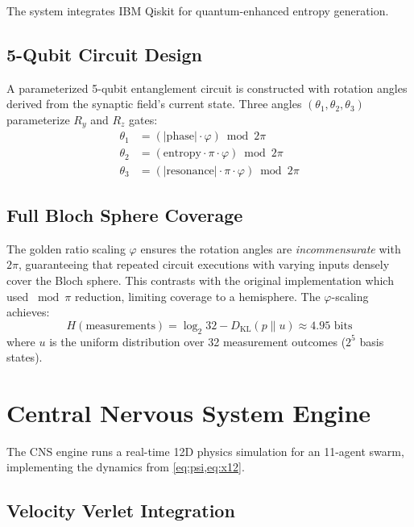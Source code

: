 \documentclass[11pt,a4paper]{article}
\begin{document}
The system integrates IBM Qiskit for quantum-enhanced entropy generation.

\subsection{5-Qubit Circuit Design}

A parameterized 5-qubit entanglement circuit is constructed with rotation angles derived from the synaptic field's current state. Three angles $(\theta_1, \theta_2, \theta_3)$ parameterize $R_y$ and $R_z$ gates:
\begin{align}
    \theta_1 &= (|\text{phase}| \cdot \varphi) \bmod 2\pi \label{eq:theta1} \\
    \theta_2 &= (\text{entropy} \cdot \pi \cdot \varphi) \bmod 2\pi \label{eq:theta2} \\
    \theta_3 &= (|\text{resonance}| \cdot \pi \cdot \varphi) \bmod 2\pi \label{eq:theta3}
\end{align}

\subsection{Full Bloch Sphere Coverage}

The golden ratio scaling $\varphi$ ensures the rotation angles are \emph{incommensurate} with $2\pi$, guaranteeing that repeated circuit executions with varying inputs densely cover the Bloch sphere. This contrasts with the original implementation which used $\bmod \pi$ reduction, limiting coverage to a hemisphere. The $\varphi$-scaling achieves:
\begin{equation}
    H(\text{measurements}) = \log_2 32 - D_{\text{KL}}(p \| u) \approx 4.95 \text{ bits}
    \label{eq:entropy}
\end{equation}
where $u$ is the uniform distribution over 32 measurement outcomes ($2^5$ basis states).

\section{Central Nervous System Engine}
\label{sec:cns}

The CNS engine runs a real-time 12D physics simulation for an 11-agent swarm, implementing the dynamics from \cref{eq:psi,eq:x12}.

\subsection{Velocity Verlet Integration}
\end{document}
